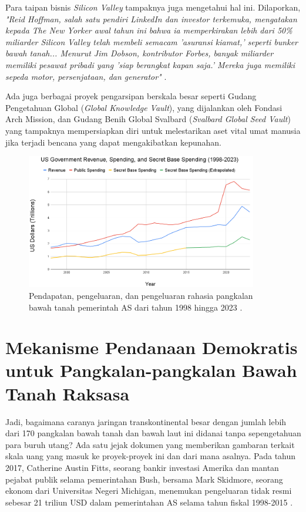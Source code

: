 \documentclass[10pt,twocolumn,letterpaper]{article}
\begin{document}
Para taipan bisnis \textit{Silicon Valley} tampaknya juga mengetahui hal ini. Dilaporkan, \textit{"Reid Hoffman, salah satu pendiri LinkedIn dan investor terkemuka, mengatakan kepada The New Yorker awal tahun ini bahwa ia memperkirakan lebih dari 50\% miliarder Silicon Valley telah membeli semacam 'asuransi kiamat,' seperti bunker bawah tanah... Menurut Jim Dobson, kontributor Forbes, banyak miliarder memiliki pesawat pribadi yang 'siap berangkat kapan saja.' Mereka juga memiliki sepeda motor, persenjataan, dan generator"} \cite{28}.

Ada juga berbagai proyek pengarsipan berskala besar seperti Gudang Pengetahuan Global (\textit{Global Knowledge Vault}), yang dijalankan oleh Fondasi Arch Mission, \cite{29} dan Gudang Benih Global Svalbard (\textit{Svalbard Global Seed Vault}) \cite{30} yang tampaknya mempersiapkan diri untuk melestarikan aset vital umat manusia jika terjadi bencana yang dapat mengakibatkan kepunahan.

\begin{figure}[t]
\begin{center}
\includegraphics[width=0.9\textwidth]{govcrop2.png}
\end{center}
   \caption{Pendapatan, pengeluaran, dan pengeluaran rahasia pangkalan bawah tanah pemerintah AS dari tahun 1998 hingga 2023 \cite{19}.}
   \label{fig:9}
\end{figure}

\section{Mekanisme Pendanaan Demokratis untuk Pangkalan-pangkalan Bawah Tanah Raksasa}

Jadi, bagaimana caranya jaringan transkontinental besar dengan jumlah lebih dari 170 pangkalan bawah tanah dan bawah laut ini didanai tanpa sepengetahuan para buruh utang? Ada satu jejak dokumen yang memberikan gambaran terkait skala uang yang masuk ke proyek-proyek ini dan dari mana asalnya. Pada tahun 2017, Catherine Austin Fitts, seorang bankir investasi Amerika dan mantan pejabat publik selama pemerintahan Bush, bersama Mark Skidmore, seorang ekonom dari Universitas Negeri Michigan, menemukan pengeluaran tidak resmi sebesar 21 triliun USD dalam pemerintahan AS selama tahun fiskal 1998-2015 \cite{11,12,13}.
\end{document}
